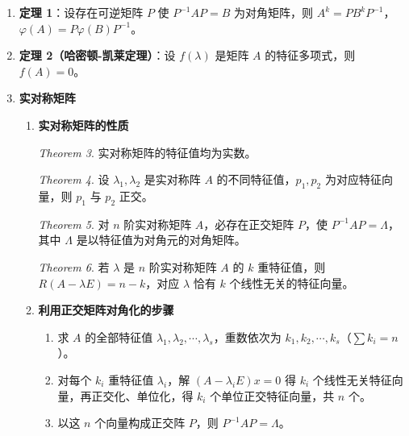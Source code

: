 \documentclass[UTF8]{ctexart}
\theoremstyle{remark}
\newtheorem{theorem}{Theorem}
\newtheorem{corollary}{Corollary}
\begin{document}
\begin{enumerate}
(2) 方阵对角化  
\begin{theorem}
	\(n\) 阶矩阵 \(A\) 可对角化（即存在可逆矩阵 \(P\) 使 \(P^{-1}AP = \Lambda\) 为对角阵）的充要条件是 \(A\) 有 \(n\) 个线性无关的特征向量。
\end{theorem}
\begin{corollary}
	若 \(A\) 的 \(n\) 个特征值互不相等，则 \(A\) 可对角化。
\end{corollary}

(3) 利用对角矩阵计算矩阵的幂及矩阵多项式  
\begin{theorem}
	设 \(\varphi(A) = a_0E + a_1A + a_2A^2 + \cdots + a_mA^m\)，若存在可逆矩阵 \(P\) 使 \(P^{-1}AP = \Lambda = \text{diag}(\lambda_1, \lambda_2, \cdots, \lambda_n)\)，则 \(\varphi(A) = P\varphi(\Lambda)P^{-1}\)，其中 \(\varphi(\Lambda) = \text{diag}(\varphi(\lambda_1), \varphi(\lambda_2), \cdots, \varphi(\lambda_n))\)。
\end{theorem}

	\item \textbf{定理 1}：设存在可逆矩阵 \(P\) 使 \(P^{-1}AP = B\) 为对角矩阵，则 \(A^k = PB^kP^{-1}\)，\(\varphi(A) = P\varphi(B)P^{-1}\)。
	\item \textbf{定理 2（哈密顿-凯莱定理）}：设 \(f(\lambda)\) 是矩阵 \(A\) 的特征多项式，则 \(f(A) = 0\)。
	
	\item \textbf{实对称矩阵}
	\begin{enumerate}
		\item \textbf{实对称矩阵的性质}
		\begin{theorem}
			实对称矩阵的特征值均为实数。
		\end{theorem}
		\begin{theorem}
			设 \(\lambda_1, \lambda_2\) 是实对称阵 \(A\) 的不同特征值，\(p_1, p_2\) 为对应特征向量，则 \(p_1\) 与 \(p_2\) 正交。
		\end{theorem}
		\begin{theorem}
			对 \(n\) 阶实对称矩阵 \(A\)，必存在正交矩阵 \(P\)，使 \(P^{-1}AP = \Lambda\)，其中 \(\Lambda\) 是以特征值为对角元的对角矩阵。
		\end{theorem}
		\begin{theorem}
			若 \(\lambda\) 是 \(n\) 阶实对称矩阵 \(A\) 的 \(k\) 重特征值，则 \(R(A - \lambda E) = n - k\)，对应 \(\lambda\) 恰有 \(k\) 个线性无关的特征向量。
		\end{theorem}
		\item \textbf{利用正交矩阵对角化的步骤}
		\begin{enumerate}
			\item 求 \(A\) 的全部特征值 \(\lambda_1, \lambda_2, \cdots, \lambda_s\)，重数依次为 \(k_1, k_2, \cdots, k_s\)（\(\sum k_i = n\)）。
			\item 对每个 \(k_i\) 重特征值 \(\lambda_i\)，解 \((A - \lambda_i E)x = 0\) 得 \(k_i\) 个线性无关特征向量，再正交化、单位化，得 \(k_i\) 个单位正交特征向量，共 \(n\) 个。
			\item 以这 \(n\) 个向量构成正交阵 \(P\)，则 \(P^{-1}AP = \Lambda\)。
		\end{enumerate}
	\end{enumerate}
	

\end{enumerate}
\end{document}
